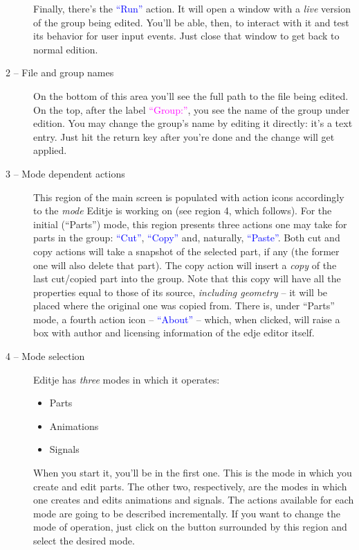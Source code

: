 \documentclass[a4paper]{profusion}
\newcommand{\GUIIcon}[1]{\textcolor{blue}{#1}}    %
\newcommand{\GUILabel}[1]{\textcolor{magenta}{#1}}
\begin{document}
\begin{description}
  Finally, there's the \GUIIcon{``Run''} action. It will open a window
  with a \emph{live} version of the group being edited. You'll be
  able, then, to interact with it and test its behavior for user input
  events. Just close that window to get back to normal edition.

\item[2 -- File and group names] On the bottom of this area you'll see
  the full path to the file being edited. On the top, after the label
  \GUILabel{``Group:''}, you see the name of the group under
  edition. You may change the group's name by editing it directly:
  it's a text entry. Just hit the return key after you're done and the
  change will get applied.

\item[3 -- Mode dependent actions] This region of the main screen is
  populated with action icons accordingly to the \emph{mode} Editje is
  working on (see region 4, which follows). For the initial
  (``Parts'') mode, this region presents three actions one may take
  for parts in the group: \GUIIcon{``Cut''}, \GUIIcon{``Copy''} and,
  naturally, \GUIIcon{``Paste''}. Both cut and copy actions will take
  a snapshot of the selected part, if any (the former one will also
  delete that part). The copy action will insert a \emph{copy} of the
  last cut/copied part into the group. Note that this copy will have
  all the properties equal to those of its source, \emph{including
    geometry} -- it will be placed where the original one was copied
  from. There is, under ``Parts'' mode, a fourth action icon --
  \GUIIcon{``About''} -- which, when clicked, will raise a box with
  author and licensing information of the edje editor itself.

\item[4 -- Mode selection] Editje has \emph{three} modes in which it
  operates:
  \begin{itemize}
  \item Parts
  \item Animations
  \item Signals
  \end{itemize}
  When you start it, you'll be in the first one. This is the mode in
  which you create and edit parts. The other two, respectively, are
  the modes in which one creates and edits animations and signals. The
  actions available for each mode are going to be described
  incrementally. If you want to change the mode of operation, just
  click on the button surrounded by this region and select the desired
  mode.


\end{description}
\end{document}
